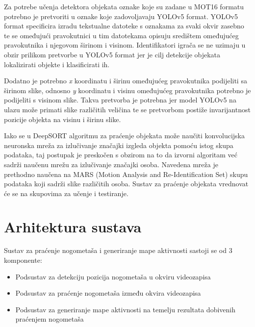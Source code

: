 \documentclass[times, utf8, seminar, numeric]{fer}
\begin{document}
Za potrebe učenja detektora objekata oznake koje su zadane u MOT16 formatu potrebno je pretvoriti u oznake koje zadovoljavaju YOLOv5 format. YOLOv5 format specificira izradu tekstualne datoteke s oznakama za svaki okvir zasebno te se omeđujući pravokutnici u tim datotekama opisuju središtem omeđujućeg pravokutnika i njegovom širinom i visinom. Identifikatori igrača se ne uzimaju u obzir prilikom pretvorbe u YOLOv5 format jer je cilj detekcije objekata lokalizirati objekte i klasificirati ih. 

Dodatno je potrebno \textit{x} koordinatu i širinu omeđujućeg pravokutnika podijeliti sa širinom slike, odnosno \textit{y} koordinatu i visinu omeđujućeg pravokutnika potrebno je podijeliti s visinom slike. Takva pretvorba je potrebna jer model YOLOv5 na ulazu može primati slike različitih veličina te se pretvorbom postiže invarijantnost pozicije objekta na visinu i širinu slike. 


Iako se u DeepSORT algoritmu za praćenje objekata može naučiti konvolucijska neuronska mreža za izlučivanje značajki izgleda objekta pomoću istog skupa podataka, taj postupak je preskočen s obzirom na to da izvorni algoritam već sadrži naučenu mrežu za izlučivanje značajki osoba. Navedena mreža je prethodno naučena na MARS (Motion Analysis and Re-Identification Set) skupu podataka koji sadrži slike različitih osoba. 
Sustav za praćenje objekata vrednovat će se na skupovima za učenje i testiranje.




\chapter{Arhitektura sustava}

Sustav za praćenje nogometaša i generiranje mape aktivnosti sastoji se od 3 komponente:
\begin{itemize}
	\item Podsustav za detekciju pozicija nogometaša u okviru videozapisa
	\item Podsustav za praćenje nogometaša između okvira videozapisa
	\item Podsustav za generiranje mape aktivnosti na temelju rezultata dobivenih praćenjem nogometaša
\end{itemize}
\end{document}
